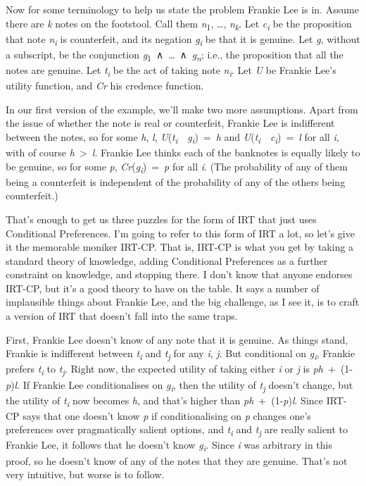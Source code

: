 \documentclass[
  10pt,
  letterpaper,
  twoside]{scrbook}
\begin{document}
Now for some terminology to help us state the problem Frankie Lee is in.
Assume there are \emph{k} notes on the footstool. Call them
\emph{n}\textsubscript{1}, \ldots, \emph{n\textsubscript{k}}. Let
\emph{c\textsubscript{i}} be the proposition that note
\emph{n\textsubscript{i}} is counterfeit, and its negation
\emph{g\textsubscript{i}} be that it is genuine. Let \emph{g}, without a
subscript, be the conjunction
\emph{g}\textsubscript{1}~∧~\ldots~∧~\emph{g\textsubscript{n}}; i.e.,
the proposition that all the notes are genuine. Let
\emph{t\textsubscript{i}} be the act of taking note
\emph{n\textsubscript{i}}. Let \emph{U} be Frankie Lee's utility
function, and \emph{Cr} his credence function.

In our first version of the example, we'll make two more assumptions.
Apart from the issue of whether the note is real or counterfeit, Frankie
Lee is indifferent between the notes, so for some \emph{h}, \emph{l},
\emph{U}(\emph{t\textsubscript{i}}~\textbar~\emph{g\textsubscript{i}})~=~\emph{h}
and
\emph{U}(\emph{t\textsubscript{i}}~\textbar~\emph{c\textsubscript{i}})~=~\emph{l}
for all \emph{i}, with of course \emph{h}~\textgreater~\emph{l}. Frankie
Lee thinks each of the banknotes is equally likely to be genuine, so for
some \emph{p}, \emph{Cr}(\emph{g\textsubscript{i}})~=~\emph{p} for all
\emph{i}. (The probability of any of them being a counterfeit is
independent of the probability of any of the others being counterfeit.)

That's enough to get us three puzzles for the form of IRT that just uses
Conditional Preferences. I'm going to refer to this form of IRT a lot,
so let's give it the memorable moniker IRT-CP. That is, IRT-CP is what
you get by taking a standard theory of knowledge, adding Conditional
Preferences as a further constraint on knowledge, and stopping there. I
don't know that anyone endorses IRT-CP, but it's a good theory to have
on the table. It says a number of implausible things about Frankie Lee,
and the big challenge, as I see it, is to craft a version of IRT that
doesn't fall into the same traps.

First, Frankie Lee doesn't know of any note that it is genuine. As
things stand, Frankie is indifferent between \emph{t\textsubscript{i}}
and \emph{t\textsubscript{j}} for any \emph{i}, \emph{j}. But
conditional on \emph{g\textsubscript{i}}, Frankie prefers
\emph{t\textsubscript{i}} to \emph{t\textsubscript{j}}. Right now, the
expected utility of taking either \emph{i} or \emph{j} is
\emph{ph}~+~(1-\emph{p})\emph{l}. If Frankie Lee conditionalises on
\emph{g\textsubscript{i}}, then the utility of \emph{t\textsubscript{j}}
doesn't change, but the utility of \emph{t\textsubscript{i}} now becomes
\emph{h}, and that's higher than \emph{ph}~+~(1-\emph{p})\emph{l}. Since
IRT-CP says that one doesn't know \emph{p} if conditionalising on
\emph{p} changes one's preferences over pragmatically salient options,
and \emph{t\textsubscript{i}} and \emph{t\textsubscript{j}} are really
salient to Frankie Lee, it follows that he doesn't know
\emph{g\textsubscript{i}}. Since \emph{i} was arbitrary in this proof,
so he doesn't know of any of the notes that they are genuine. That's not
very intuitive, but worse is to follow.
\end{document}
